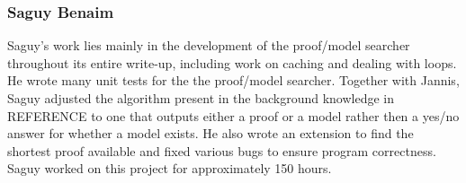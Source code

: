 \subsubsection*{Saguy Benaim}

Saguy's work lies mainly in the development of the proof/model searcher throughout its entire write-up, including work on caching and dealing with loops. He wrote many unit tests for the the proof/model searcher. Together with Jannis, Saguy adjusted the algorithm present in the background knowledge in REFERENCE to one that outputs either a proof or a model rather then a yes/no answer for whether a model exists. He also wrote an extension to find the shortest proof available and fixed various bugs to ensure program correctness. Saguy worked on this project for approximately 150 hours. 
